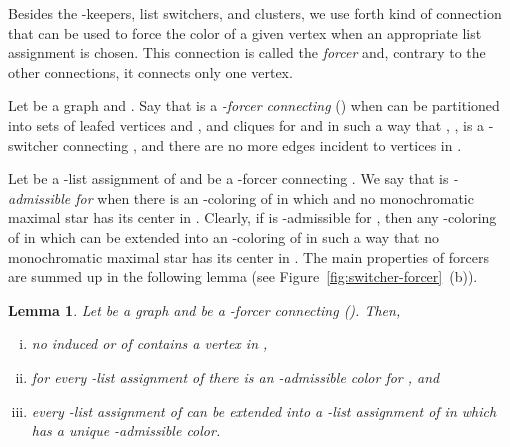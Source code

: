 \documentclass[a4paper, 11pt, oneside]{article}
\newtheorem{lemma}[theorem]{Lemma}
\begin{document}
Besides the -keepers, list switchers, and clusters, we use forth kind of connection that can be used to force the color of a given vertex when an appropriate list assignment is chosen.  This connection is called the \emph{forcer} and, contrary to the other connections, it connects only one vertex.

\begin{defn}[-forcer]\label{def:k-forcer connection}
  Let  be a graph and .  Say that  is a \emph{-forcer connecting } () when  can be partitioned into sets of leafed vertices  and , and cliques  for  and  in such a way that , ,  is a -switcher connecting , and there are no more edges incident to vertices in .
\end{defn}

Let  be a -list assignment of  and  be a -forcer connecting .  We say that  is \emph{-admissible for } when there is an -coloring  of  in which  and no monochromatic maximal star has its center in .  Clearly, if  is -admissible for , then any -coloring  of  in which  can be extended into an -coloring of  in such a way that no monochromatic maximal star has its center in .  The main properties of forcers are summed up in the following lemma (see Figure~\ref{fig:switcher-forcer}~(b)).

\begin{lemma}\label{lem:forcer properties}
  Let  be a graph and  be a -forcer connecting  ().  Then, 
  \begin{enumerate}[(i)]
    \item no induced  or  of  contains a vertex in ,\label{lem:forcer properties:forbidden}
    \item for every -list assignment  of  there is an -admissible color for , and\label{lem:forcer properties:extension}
    \item every -list assignment  of  can be extended into a -list assignment of  in which  has a unique -admissible color.\label{lem:forcer properties:color}
  \end{enumerate}
\end{lemma}
\end{document}
